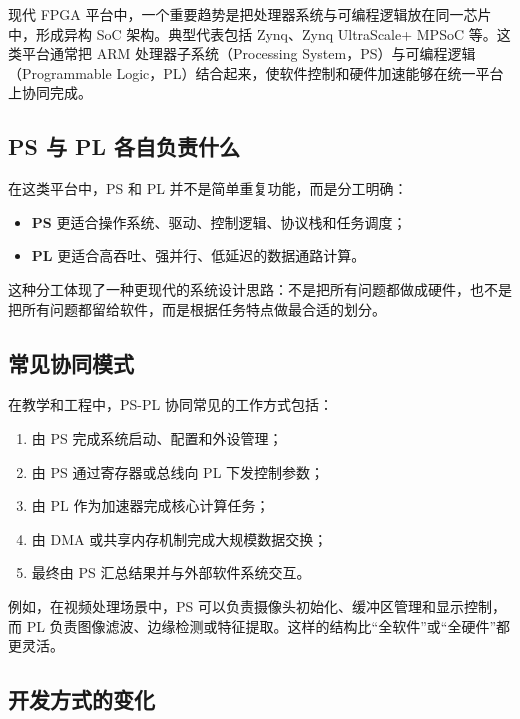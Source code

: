 现代 FPGA
平台中，一个重要趋势是把处理器系统与可编程逻辑放在同一芯片中，形成异构
SoC 架构。典型代表包括 Zynq、Zynq UltraScale+ MPSoC 等。这类平台通常把
ARM 处理器子系统（Processing System，PS）与可编程逻辑（Programmable
Logic，PL）结合起来，使软件控制和硬件加速能够在统一平台上协同完成。

\subsection{PS 与 PL
各自负责什么}\label{ps-ux4e0e-pl-ux5404ux81eaux8d1fux8d23ux4ec0ux4e48}

在这类平台中，PS 和 PL 并不是简单重复功能，而是分工明确：

\begin{itemize}
\tightlist
\item
  \textbf{PS} 更适合操作系统、驱动、控制逻辑、协议栈和任务调度；
\item
  \textbf{PL} 更适合高吞吐、强并行、低延迟的数据通路计算。
\end{itemize}

这种分工体现了一种更现代的系统设计思路：不是把所有问题都做成硬件，也不是把所有问题都留给软件，而是根据任务特点做最合适的划分。

\subsection{常见协同模式}\label{ux5e38ux89c1ux534fux540cux6a21ux5f0f}

在教学和工程中，PS-PL 协同常见的工作方式包括：

\begin{enumerate}
\def\labelenumi{\arabic{enumi}.}
\tightlist
\item
  由 PS 完成系统启动、配置和外设管理；
\item
  由 PS 通过寄存器或总线向 PL 下发控制参数；
\item
  由 PL 作为加速器完成核心计算任务；
\item
  由 DMA 或共享内存机制完成大规模数据交换；
\item
  最终由 PS 汇总结果并与外部软件系统交互。
\end{enumerate}

例如，在视频处理场景中，PS
可以负责摄像头初始化、缓冲区管理和显示控制，而 PL
负责图像滤波、边缘检测或特征提取。这样的结构比``全软件''或``全硬件''都更灵活。

\subsection{开发方式的变化}\label{ux5f00ux53d1ux65b9ux5f0fux7684ux53d8ux5316}

